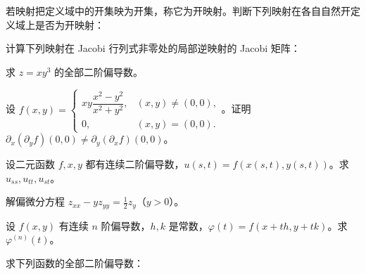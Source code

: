 \noindent\begin{minipage}{\textwidth}
若映射把定义域中的开集映为开集，称它为开映射。判断下列映射在各自自然开定义域上是否为开映射：
\end{minipage}\par\vfill
\noindent\begin{minipage}{\textwidth}
计算下列映射在 Jacobi 行列式非零处的局部逆映射的 Jacobi 矩阵：
\end{minipage}\par\vfill
\newpage
\noindent\begin{minipage}{\textwidth}
求 $z=xy^3$ 的全部二阶偏导数。
\end{minipage}\par\vfill
\noindent\begin{minipage}{\textwidth}
设 $f(x,y)=\begin{cases}xy\dfrac{x^2-y^2}{x^2+y^2},&(x,y)\ne(0,0),\\0,&(x,y)=(0,0).\end{cases}$。证明 $\partial_x(\partial_yf)(0,0)\ne\partial_y(\partial_xf)(0,0)$。
\end{minipage}\par\vfill
\noindent\begin{minipage}{\textwidth}
设二元函数 $f,x,y$ 都有连续二阶偏导数，$u(s,t)=f(x(s,t),y(s,t))$。求 $u_{ss},u_{tt},u_{st}$。
\end{minipage}\par\vfill
\newpage
\noindent\begin{minipage}{\textwidth}
解偏微分方程 $z_{xx}-yz_{yy}=\tfrac12z_y$（$y>0$）。
\end{minipage}\par\vfill
\noindent\begin{minipage}{\textwidth}
设 $f(x,y)$ 有连续 $n$ 阶偏导数，$h,k$ 是常数，$\varphi(t)=f(x+th,y+tk)$。求 $\varphi^{(n)}(t)$。
\end{minipage}\par\vfill
\noindent\begin{minipage}{\textwidth}
求下列函数的全部二阶偏导数：
\end{minipage}\par\vfill
